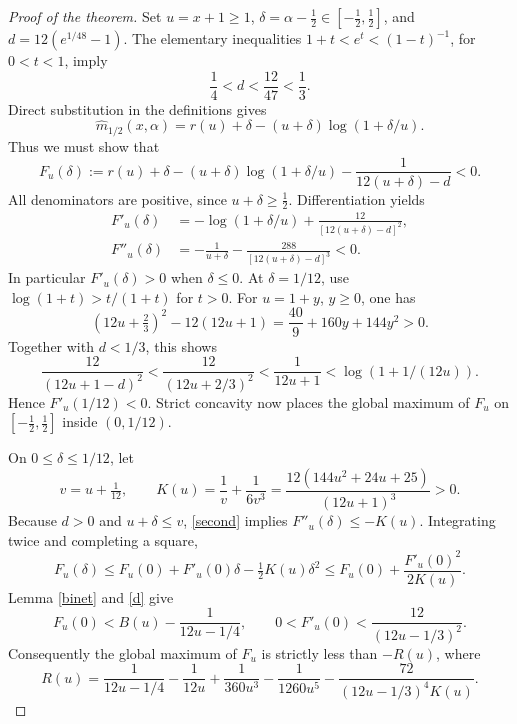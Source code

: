\documentclass[11pt]{article}
\begin{document}
\newpage
\begin{proof}[Proof of the theorem]
Set \(u=x+1\geq1\), \(\delta=\alpha-\tfrac12\in[-\tfrac12,\tfrac12]\),
and \(d=12(e^{1/48}-1)\). The elementary inequalities
\(1+t<e^t<(1-t)^{-1}\), for \(0<t<1\), imply
\begin{equation}\label{d}
 \frac14<d<\frac{12}{47}<\frac13.
\end{equation}
Direct substitution in the definitions gives
\[
 \widehat m_{1/2}(x,\alpha)
 =r(u)+\delta-(u+\delta)\log(1+\delta/u).
\]
Thus we must show that
\[
 F_u(\delta):=r(u)+\delta-(u+\delta)\log(1+\delta/u)
             -\frac1{12(u+\delta)-d}<0.
\]
All denominators are positive, since \(u+\delta\geq\tfrac12\).
Differentiation yields
\begin{align}
 F'_u(\delta)&=-\log(1+\delta/u)+\frac{12}{[12(u+\delta)-d]^2},
                                                        \label{first}\\
 F''_u(\delta)&=-\frac1{u+\delta}
               -\frac{288}{[12(u+\delta)-d]^3}<0.         \label{second}
\end{align}
In particular \(F'_u(\delta)>0\) when \(\delta\leq0\). At
\(\delta=1/12\), use \(\log(1+t)>t/(1+t)\) for \(t>0\).
For \(u=1+y\), \(y\geq0\), one has
\[
 (12u+\tfrac23)^2-12(12u+1)
 =\frac{40}{9}+160y+144y^2>0.
\]
Together with \(d<1/3\), this shows
\[
 \frac{12}{(12u+1-d)^2}
 <\frac{12}{(12u+2/3)^2}
 <\frac1{12u+1}
 <\log(1+1/(12u)).
\]
Hence \(F'_u(1/12)<0\). Strict concavity now places the global
maximum of \(F_u\) on \([-\tfrac12,\tfrac12]\) inside \((0,1/12)\).

On \(0\leq\delta\leq1/12\), let
\[
 v=u+\tfrac1{12},\qquad
 K(u)=\frac1v+\frac1{6v^3}
     =\frac{12(144u^2+24u+25)}{(12u+1)^3}>0.
\]
Because \(d>0\) and \(u+\delta\leq v\), \eqref{second} implies
\(F''_u(\delta)\leq-K(u)\). Integrating twice and completing a square,
\[
 F_u(\delta)\leq F_u(0)+F'_u(0)\delta-\tfrac12K(u)\delta^2
 \leq F_u(0)+\frac{F'_u(0)^2}{2K(u)}.
\]
Lemma \ref{binet} and \eqref{d} give
\[
 F_u(0)<B(u)-\frac1{12u-1/4},\qquad
 0<F'_u(0)<\frac{12}{(12u-1/3)^2}.
\]
Consequently the global maximum of \(F_u\) is strictly less than
\(-R(u)\), where
\begin{equation}\label{rational}
 R(u)=\frac1{12u-1/4}-\frac1{12u}+\frac1{360u^3}
      -\frac1{1260u^5}-\frac{72}{(12u-1/3)^4K(u)}.
\end{equation}


\end{proof}
\end{document}
